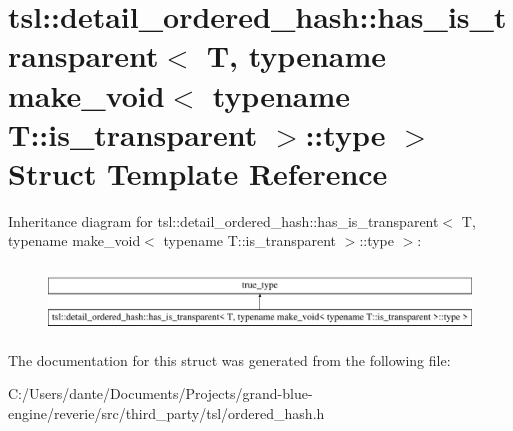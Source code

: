 \hypertarget{structtsl_1_1detail__ordered__hash_1_1has__is__transparent_3_01_t_00_01typename_01make__void_3_0460f56a944c827d85d7f5fbfa5abdc1d}{}\section{tsl\+::detail\+\_\+ordered\+\_\+hash\+::has\+\_\+is\+\_\+transparent$<$ T, typename make\+\_\+void$<$ typename T\+::is\+\_\+transparent $>$\+::type $>$ Struct Template Reference}
\label{structtsl_1_1detail__ordered__hash_1_1has__is__transparent_3_01_t_00_01typename_01make__void_3_0460f56a944c827d85d7f5fbfa5abdc1d}
Inheritance diagram for tsl\+::detail\+\_\+ordered\+\_\+hash\+::has\+\_\+is\+\_\+transparent$<$ T, typename make\+\_\+void$<$ typename T\+::is\+\_\+transparent $>$\+::type $>$\+:\begin{figure}[H]
\begin{center}
\leavevmode
\includegraphics[height=1.772152cm]{structtsl_1_1detail__ordered__hash_1_1has__is__transparent_3_01_t_00_01typename_01make__void_3_0460f56a944c827d85d7f5fbfa5abdc1d}
\end{center}
\end{figure}


The documentation for this struct was generated from the following file\+:\begin{DoxyCompactItemize}
\item 
C\+:/\+Users/dante/\+Documents/\+Projects/grand-\/blue-\/engine/reverie/src/third\+\_\+party/tsl/ordered\+\_\+hash.\+h\end{DoxyCompactItemize}
